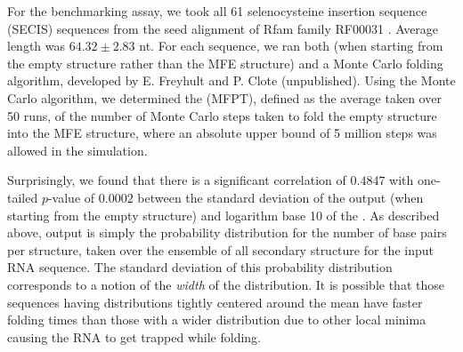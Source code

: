 For the benchmarking assay, we took all 61 selenocysteine insertion sequence
(SECIS) sequences from the seed alignment of Rfam family RF00031
\citep{Gardner.nar11}. Average length was $64.32 \pm 2.83$ nt.
For each sequence, we ran both \fftbor (when starting
from the empty structure rather than the MFE structure) and a Monte Carlo
folding algorithm, developed by E. Freyhult and P. Clote (unpublished).
Using the Monte Carlo algorithm, we
determined the \mfpt (MFPT), defined as the average
taken over 50 runs, of the number of Monte Carlo steps taken to fold
the empty structure into the MFE structure, where an absolute upper bound
of 5 million steps was allowed in the simulation.

Surprisingly, we found that there is a significant
correlation of $0.4847$ with one-tailed
$p$-value of $0.0002$ between the
standard deviation of the \fftbor output (when starting from the
empty structure) and logarithm base 10 of the \mfpt.
As described above, \fftbor output is simply
the probability distribution
for the number of base pairs per structure, taken over the ensemble
of all secondary structure for the input RNA
sequence. The standard deviation of this probability distribution corresponds
to a notion of the {\em width} of the distribution. It is possible that those
sequences having distributions tightly centered around the
mean have faster folding times than those with a wider distribution
due to other local minima causing the RNA to get trapped while folding.

